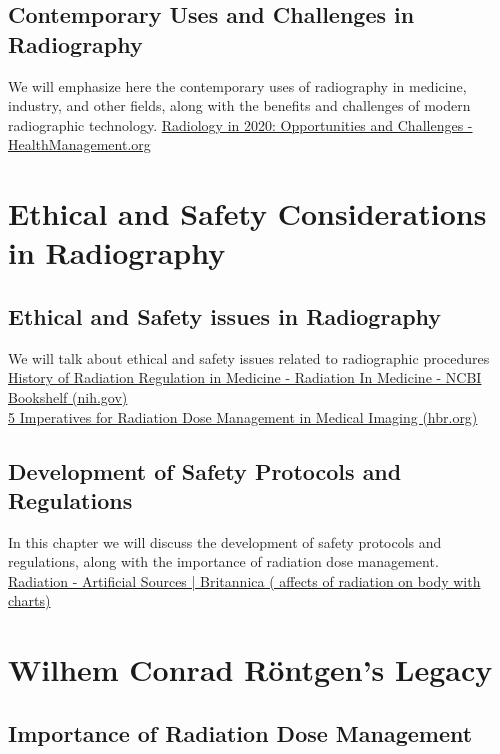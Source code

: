 \documentclass[a4paper,12pt]{report}
\begin{document}
\section{Contemporary Uses and Challenges in Radiography}
We will emphasize here the contemporary uses of radiography in medicine, industry, and other fields, along with the benefits and challenges of modern radiographic technology.
\href{https://healthmanagement.org/c/healthmanagement/issuearticle/radiology-in-2020-opportunities-and-challenges#:~:text=%E2%80%A2%20Radiological%20technology%20is%20shifting%20from%20a%20%E2%80%9Cdisruptive%E2%80%9D,In%20vitro%20diagnostics%20will%20change%20radiological%20screening%20policy.}{Radiology in 2020: Opportunities and Challenges - HealthManagement.org }


\chapter{Ethical and Safety Considerations in Radiography}

\section{Ethical and Safety issues in Radiography}
We will talk about ethical and safety issues related to radiographic procedures\\
\href{https://www.ncbi.nlm.nih.gov/books/NBK232703/}{History of Radiation Regulation in Medicine - Radiation In Medicine - NCBI Bookshelf (nih.gov)}\\
\href{https://hbr.org/sponsored/2022/10/5-imperatives-for-radiation-dose-management-in-medical-imaging}{5 Imperatives for Radiation Dose Management in Medical Imaging  (hbr.org)}
\section{Development of Safety Protocols and Regulations}
In this chapter we will discuss the development of safety protocols and regulations, along with the importance of radiation dose management.\\
\href{https://www.britannica.com/science/radiation/Artificial-sources}{Radiation - Artificial Sources | Britannica ( affects of radiation on body with charts)}

\chapter{Wilhem Conrad Röntgen's Legacy}
\section{Importance of Radiation Dose Management}
\end{document}
